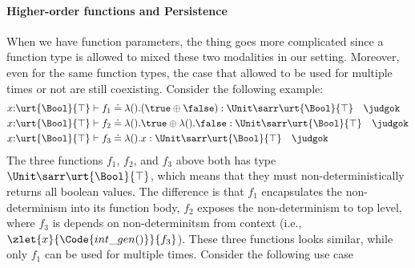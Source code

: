 \paragraph{Higher-order functions and Persistence}
When we have function parameters, the thing goes more complicated since a function type is allowed to mixed these two modalities in our setting. Moreover, even for the same function types, the case that allowed to be used for multiple times or not are still coexisting. Consider the following example:
\begin{align*}
  &x{:}\urt{\Bool}{\top} \vdash f_1 \doteq \lambda ().(\true \oplus \false) : \Unit\sarr\urt{\Bool}{\top} \quad \judgok
  \\&x{:}\urt{\Bool}{\top} \vdash f_2 \doteq \lambda ().\true \oplus \lambda ().\false : \Unit\sarr\urt{\Bool}{\top} \quad \judgok
  \\&x{:}\urt{\Bool}{\top} \vdash f_3 \doteq \lambda ().x : \Unit\sarr\urt{\Bool}{\top} \quad \judgok
\end{align*}\noindent
The three functions $f_1$, $f_2$, and $f_3$ above both has type $\Unit\sarr\urt{\Bool}{\top}$, which means that they must non-deterministically returns all boolean values. The difference is that $f_1$ encapsulates the non-determinism into its function body, $f_2$ exposes the non-determinism to top level, where $f_3$ is depends on non-determinitsm from context (i.e., $\zlet{x}{\Code{int\_gen()}}{f_3}$). These three functions looks similar, while only $f_1$ can be used for multiple times. Consider the following use case
